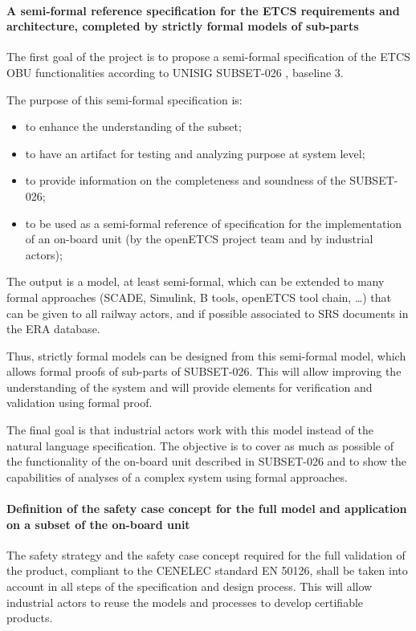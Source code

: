 \documentclass{template/openetcs_article}
\begin{document}
\paragraph{A semi-formal reference specification for the ETCS requirements and architecture, completed by strictly formal models of sub-parts} 



The first goal of the project is to propose a semi-formal specification of the \gls{ETCS} \gls{OBU} functionalities according to UNISIG SUBSET-026 \citep{subset026}, baseline 3.

The purpose of this semi-formal specification is:
\begin{itemize}
\item to enhance the understanding of the subset;
\item to have an artifact for testing and analyzing purpose at system level;
\item to provide information on the completeness and soundness of the SUBSET-026;
\item to be used as a semi-formal reference of specification for the implementation of an on-board unit
(by the openETCS project team and by industrial actors);
\end{itemize}

The output is a model, at least semi-formal, which can be extended to many formal approaches (SCADE,
Simulink, B tools, openETCS tool chain, \dots) that can be given to all railway actors, and
if possible associated to SRS documents in the ERA database.

Thus, strictly formal models can be designed from this semi-formal model, which allows formal proofs of sub-parts of SUBSET-026. This will allow improving the understanding of the system and will provide elements for verification and validation using formal proof.

The final goal is that industrial actors work with this model instead of the
natural language specification.
The objective is to cover as much as possible of the functionality of the on-board unit described in SUBSET-026 and to show the capabilities of analyses of a complex system using formal approaches.


\paragraph{Definition of the safety case concept for the full model and application on a subset of the on-board unit}
The safety strategy and the safety case concept required for the full validation of the product, compliant to the CENELEC standard EN 50126, shall be taken into account in all steps of the specification and design process. This will allow industrial actors to reuse the models and processes to develop certifiable products.
\end{document}
